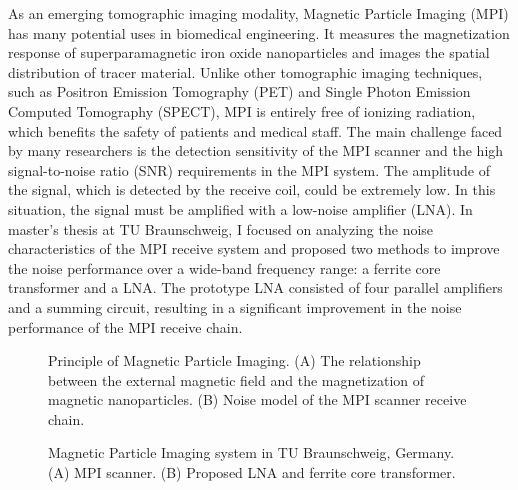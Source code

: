 \documentclass[
    ngerman,american
    ]{scrartcl}
\begin{document}
 As an emerging tomographic imaging modality, Magnetic Particle Imaging (MPI) has many
 potential uses in biomedical engineering. It measures the magnetization response of superparamagnetic
 iron oxide nanoparticles and images the spatial distribution of tracer material.
 Unlike other tomographic imaging techniques, such as Positron Emission Tomography (PET)
 and Single Photon Emission Computed Tomography (SPECT), MPI is entirely free of
 ionizing radiation, which benefits the safety of patients and medical staff.
 The main challenge faced by many researchers is the detection sensitivity of the MPI scanner
 and the high signal-to-noise ratio (SNR) requirements in the MPI system. The amplitude of
 the signal, which is detected by the receive coil, could be extremely low. In this situation,
 the signal must be amplified with a low-noise amplifier (LNA). In master's thesis at TU Braunschweig, I focused on analyzing the noise characteristics of the MPI receive system and proposed two methods to improve the noise performance over a wide-band frequency range: a ferrite core transformer and a LNA. The prototype LNA consisted of four parallel amplifiers and a summing circuit, resulting in a significant improvement in the noise performance of the MPI receive chain.
 
  \begin{figure}[H]
 	\caption{Principle of Magnetic Particle Imaging. (A) The relationship between the external magnetic field and the magnetization of magnetic nanoparticles. (B) Noise model of the MPI scanner receive chain. }
 	\label{MPI_model}
 \end{figure}  
 
 \begin{figure}[H]
 	
 	\caption{Magnetic Particle Imaging system in TU Braunschweig, Germany. (A) MPI scanner. (B) Proposed LNA and  ferrite core transformer. }
 	\label{MPI}
 \end{figure}  
 
\end{document}

